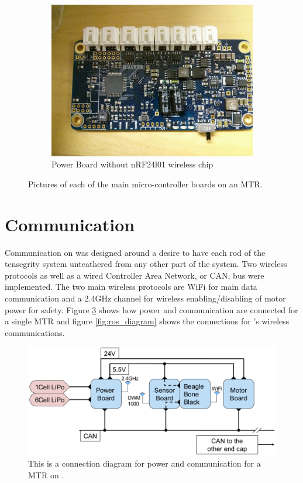 \begin{figure}[thpb]
\begin{subfigure}{.3\textwidth}
      \centering
      \includegraphics[width=\columnwidth]{tex/img/power_board}
      \caption{Power Board without nRF24l01 wireless chip}
      \label{fig:power_board}
\end{subfigure}
\caption{Pictures of each of the main micro-controller boards on an MTR.}
\label{fig:MTR_uC_boards}
\end{figure}

\section{Communication}
\label{communication}

Communication on \SB{} was designed around a desire to have each rod of the tensegrity system unteathered from any other part of the system.
Two wireless protocols as well as a wired Controller Area Network, or CAN, bus were implemented.
The two main wireless protocols are WiFi for main data communication and a 2.4GHz channel for wireless enabling/disabling of motor power for safety.
Figure \ref{fig:connection_diagram} shows how power and communication are connected for a single MTR and figure \ref{fig:ros_diagram} shows the connections for \SB{}'s wireless communications.

\begin{figure}[thpb]%
      \centering
      \includegraphics[width=0.8\columnwidth]{tex/img/hard_wire_connection}
      \caption{This is a connection diagram for power and communication for a MTR on \SB{}.}
      \label{fig:connection_diagram}
\end{figure}


